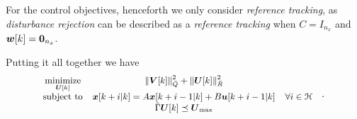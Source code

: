 \documentclass[../main.tex]{subfiles}
\begin{document}
For the control objectives, henceforth we only consider \emph{reference tracking}, as \emph{disturbance rejection} can be described as a \emph{reference tracking} when ${ C=I_{n_{x}} }$ and ${ \boldsymbol{w}[k]=\mathbf{0}_{n_{x}} }$.

Putting it all together we have
\begin{equation}
  \small
  \begin{aligned}
    \begin{matrix}
      \underset{\boldsymbol{U}[k]}{\mathrm{minimize}} &\left\lVert\boldsymbol{V}[k]\right\rVert^{2}_{\bar{Q}} + \left\lVert\boldsymbol{U}[k] \right\rVert^{2}_{\bar{R}}&\\
      \mathrm{subject~ to} &
      \boldsymbol{x}[k+i|k]=A\boldsymbol{x}[k+i-1|k]+B\boldsymbol{u}[k+i-1|k]
      &
       \forall i\in\mathcal{H} \\
      &\bar{\Gamma}\boldsymbol{U}[k]\preceq {\boldsymbol{U}}_{\text{max}}&

    \end{matrix}
  \end{aligned}
  \label{eq:general_qp}
  \quad.
\end{equation}
\end{document}
